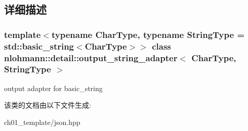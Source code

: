 \subsection{详细描述}
\subsubsection*{template$<$typename Char\+Type, typename String\+Type = std\+::basic\+\_\+string$<$\+Char\+Type$>$$>$\newline
class nlohmann\+::detail\+::output\+\_\+string\+\_\+adapter$<$ Char\+Type, String\+Type $>$}

output adapter for basic\+\_\+string 

该类的文档由以下文件生成\+:\begin{DoxyCompactItemize}
\item 
ch01\+\_\+template/json.\+hpp\end{DoxyCompactItemize}
